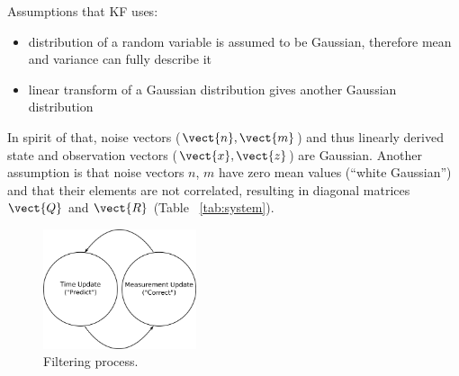 Assumptions that KF uses:
\begin{itemize}
\item distribution of a random variable is assumed to be Gaussian, therefore mean and variance can fully describe it
\item linear transform of a Gaussian distribution gives another Gaussian distribution 
\end{itemize}
In spirit of that, noise vectors ($\vect{n}, \vect{m}$)  and thus linearly derived state and observation vectors ($\vect{x}, \vect{z}$) are Gaussian. Another assumption is that noise vectors $n$, $m$ have zero mean values (``white Gaussian'') and that their elements are not correlated, resulting in diagonal matrices $\vect{Q}$ and $\vect{R}$ (Table ~\ref{tab:system}).

\begin{figure}
\vspace{-10pt}
  \centering
    \includegraphics[width=0.4\textwidth]{kalman/fig/diagram-kalman.eps}
  \caption{Filtering process.}
\vspace{-10pt}
\label{fig:diagram-kalman}
\end{figure}

